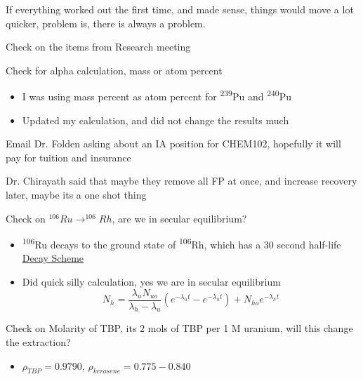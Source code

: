\documentclass[idxtotoc,hyperref,openany,oneside]{labbook} %
\newcommand{\cmark}{\ding{51}}%
\newcommand{\done}{\rlap{$\square$}{\raisebox{2pt}{\large\hspace{1pt}\cmark}}%
  \hspace{-2.5pt}}
\newcommand{\tss}{\textsuperscript}
\begin{document}
If everything worked out the first time, and made sense,
things would move a lot quicker, problem is, there is
always a problem. 




\begin{todolist}
\item{Check on the items from Research meeting}
  \begin{todolist}
  \item[\done]{Check for alpha calculation, mass or atom percent}
    \begin{itemize}
    \item{I was using mass percent as atom percent for \tss{239}Pu and \tss{240}Pu}
    \item{Updated my calculation, and did not change the results much}
    \end{itemize}
  \item[\done]{Email Dr. Folden asking about an IA position for CHEM102,
    hopefully it will pay for tuition and insurance}
  \item[\done]{Dr. Chirayath said that maybe they remove all FP at once,
    and increase recovery later, maybe its a one shot thing}
  \item[\done]{Check on $^{106}Ru\rightarrow^{106}Rh$, are we in secular equilibrium?}
    \begin{itemize}
    \item{\tss{106}Ru decays to the ground state of \tss{106}Rh, which has a 30 second half-life
      \href{http://www.nucleide.org/DDEP_WG/Nuclides/Ru-106_tables.pdf}{Decay Scheme}}
    \item{Did quick silly calculation, yes we are in secular equilibrium}
      \begin{equation*}
        N_h=\frac{\lambda_uN_{uo}}{\lambda_h-\lambda_u}
        \left(e^{-\lambda_ut}-e^{-\lambda_ht}\right)
        +N_{ho}e^{-\lambda_ht}
      \end{equation*}
    \end{itemize}
  \item[\done]{Check on Molarity of TBP, its 2 mols of TBP per 1 M uranium,
    will this change the extraction?}
    \begin{itemize}
    \item{$\rho_{TBP}=0.9790$, $\rho_{kerosene}=0.775-0.840$}

\end{itemize}
\end{todolist}
\end{todolist}
\end{document}
